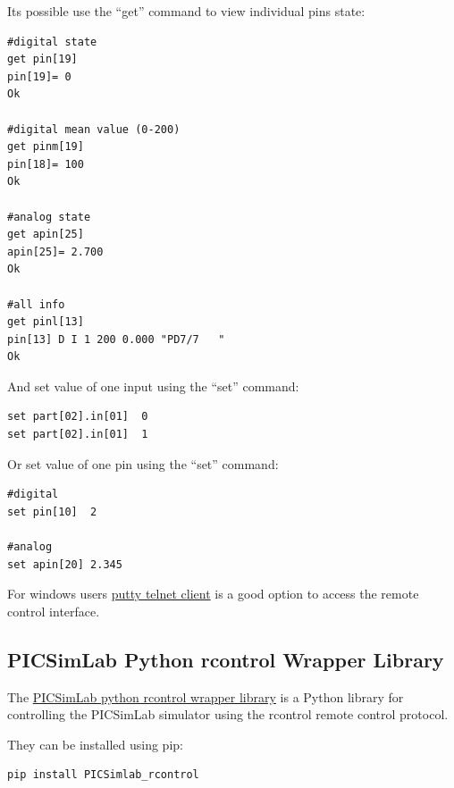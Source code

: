 Its possible use the ``get'' command to view individual pins state:
\begin{verbatim}
#digital state
get pin[19]
pin[19]= 0 
Ok

#digital mean value (0-200)
get pinm[19]
pin[18]= 100 
Ok

#analog state
get apin[25]
apin[25]= 2.700
Ok

#all info
get pinl[13]
pin[13] D I 1 200 0.000 "PD7/7   "
Ok
\end{verbatim}



And set value of one input using the ``set'' command:
\begin{verbatim}
set part[02].in[01]  0
set part[02].in[01]  1
\end{verbatim}

Or set value of one pin using the ``set'' command:
\begin{verbatim}
#digital
set pin[10]  2

#analog
set apin[20] 2.345
\end{verbatim}



For windows users \href{https://www.putty.org/}{putty telnet client} is a good option 
to access the remote control interface. 

\subsection{PICSimLab Python rcontrol Wrapper Library}

The \href{https://pypi.org/project/PICSimLab-rcontrol/}{PICSimLab python rcontrol wrapper library} is 
a Python library for controlling the PICSimLab simulator using the rcontrol remote control protocol.

They can be installed using pip:
\begin{verbatim}
pip install PICSimlab_rcontrol
\end{verbatim}

